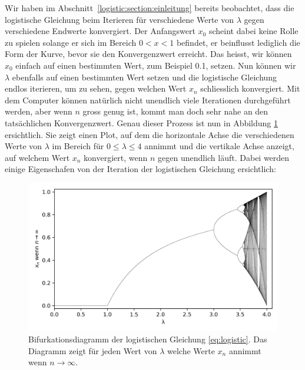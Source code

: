 Wir haben im Abschnitt~\ref{logistic:section:einleitung} 
bereits beobachtet,
dass die logistische Gleichung beim Iterieren für 
verschiedene Werte von $\lambda$ gegen verschiedene 
Endwerte konvergiert. 
Der Anfangswert $x_0$ scheint dabei keine Rolle zu spielen
solange er sich im Bereich $0 < x < 1$ befindet, 
er beinflusst lediglich die Form der Kurve, 
bevor sie den Konvergenzwert erreicht. 
Das heisst, wir können $x_0$ einfach auf einen bestimmten Wert, 
zum Beispiel 0.1, setzen. 
Nun können wir $\lambda$ ebenfalls auf einen bestimmten Wert setzen
und die logistische Gleichung endlos iterieren, 
um zu sehen, gegen welchen Wert $x_n$ schliesslich konvergiert.
Mit dem Computer können natürlich nicht unendlich viele Iterationen
durchgeführt werden, aber wenn $n$ gross genug ist, 
kommt man doch sehr nahe an den tatsächlichen Konvergenzwert. 
Genau dieser Prozess ist nun in Abbildung \ref{fig:map_1} 
ersichtlich. 
Sie zeigt einen Plot, 
auf dem die horizontale Achse die verschiedenen Werte
von $\lambda$ im Bereich für $0 \leq \lambda \leq 4$ annimmt 
und die vertikale Achse anzeigt,
auf welchem Wert $x_n$ konvergiert, wenn $n$ gegen
unendlich läuft. Dabei werden einige Eigenschafen 
von der Iteration der logistischen Gleichung ersichtlich:
\begin{figure}
    \includegraphics[width=\linewidth]{papers/logistic/figures/map.png}
    \caption{
        Bifurkationsdiagramm der logistischen Gleichung \eqref{eq:logistic}.
        Das Diagramm zeigt für jeden Wert von $\lambda$
        welche Werte $x_n$ annimmt wenn $n \rightarrow \infty$.
    }
    \label{fig:map_1}
\end{figure}
